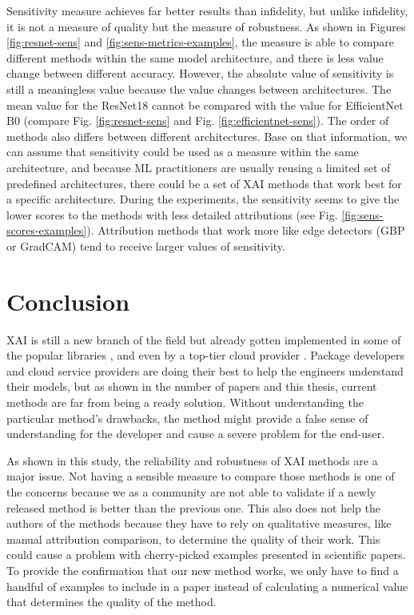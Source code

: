 \vspace{\baselineskip}

Sensitivity measure achieves far better results than infidelity, but unlike infidelity, it is not a measure of quality but the measure of robustness. As shown in Figures \ref{fig:resnet-sens} and \ref{fig:sens-metrics-examples}, the measure is able to compare different methods within the same model architecture, and there is less value change between different accuracy. However, the absolute value of sensitivity is still a meaningless value because the value changes between architectures. The mean value for the ResNet18 cannot be compared with the value for EfficientNet B0 (compare Fig. \ref{fig:resnet-sens} and Fig. \ref{fig:efficientnet-sens}). The order of methods also differs between different architectures. Base on that information, we can assume that sensitivity could be used as a measure within the same architecture, and because ML practitioners are usually reusing a limited set of predefined architectures, there could be a set of XAI methods that work best for a specific architecture. During the experiments, the sensitivity seems to give the lower scores to the methods with less detailed attributions (see Fig. \ref{fig:sens-scores-examples}). Attribution methods that work more like edge detectors (GBP or GradCAM) tend to receive larger values of sensitivity.

\section{Conclusion}

XAI is still a new branch of the field but already gotten implemented in some of the popular libraries \cite{kokhlikyan2020captum, tensorflow2015-whitepaper}, and even by a top-tier cloud provider \cite{gcp_ig}. Package developers and cloud service providers are doing their best to help the engineers understand their models, but as shown in the number of papers and this thesis, current methods are far from being a ready solution. Without understanding the particular method's drawbacks, the method might provide a false sense of understanding for the developer and cause a severe problem for the end-user.

\vspace{\baselineskip}

As shown in this study, the reliability and robustness of XAI methods are a major issue. Not having a sensible measure to compare those methods is one of the concerns because we as a community are not able to validate if a newly released method is better than the previous one. This also does not help the authors of the methods because they have to rely on qualitative measures, like manual attribution comparison, to determine the quality of their work. This could cause a problem with cherry-picked examples presented in scientific papers. To provide the confirmation that our new method works, we only have to find a handful of examples to include in a paper instead of calculating a numerical value that determines the quality of the method.

